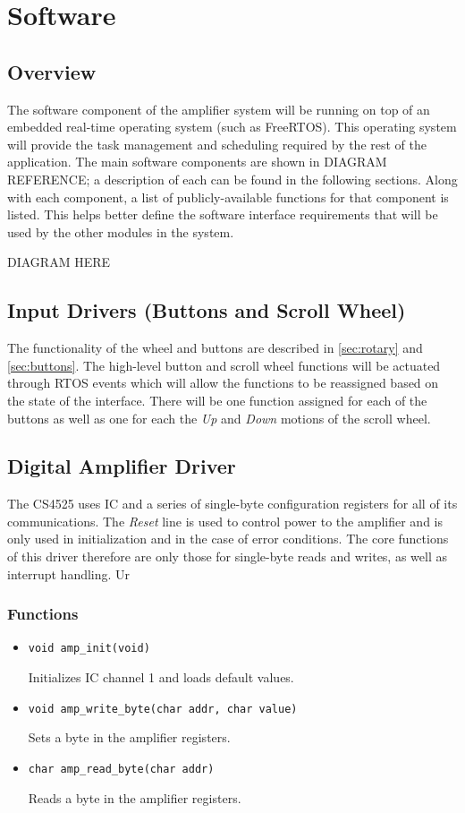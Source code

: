 \chapter{Software}

\section{Overview}
\label{sec:software-overview}
The software component of the amplifier system will be running on top of an embedded real-time operating system (such as FreeRTOS). This operating system will provide the task management and scheduling required by the rest of the application. The main software components are shown in DIAGRAM REFERENCE; a description of each can be found in the following sections. Along with each component, a list of publicly-available functions for that component is listed. This helps better define the software interface requirements that will be used by the other modules in the system.

DIAGRAM HERE

\section{Input Drivers (Buttons and Scroll Wheel)}
\label{sec:io-driver}
The functionality of the wheel and buttons are described in \autoref{sec:rotary} and \autoref{sec:buttons}. The high-level button and scroll wheel functions will be actuated through RTOS events which will allow the functions to be reassigned based on the state of the interface. There will be one function assigned for each of the buttons as well as one for each the \emph{Up} and \emph{Down} motions of the scroll wheel.

\section{Digital Amplifier Driver}
\label{sec:amp-driver}
The CS4525 uses IC and a series of single-byte configuration registers for all of its communications. The \emph{Reset} line is used to control power to the amplifier and is only used in initialization and in the case of error conditions. The core functions of this driver therefore are only those for single-byte reads and writes, as well as interrupt handling. Ur

\subsection*{Functions}
\begin{itemize}
\item \verb|void amp_init(void)|

Initializes IC channel 1 and loads default values.

\item \verb|void amp_write_byte(char addr, char value)|

Sets a byte in the amplifier registers.

\item \verb|char amp_read_byte(char addr)|

Reads a byte in the amplifier registers.
\end{itemize}

